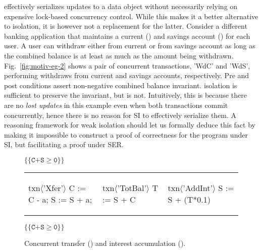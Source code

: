  effectively serializes updates to a data
object without necessarily relying on expensive lock-based concurrency
control. While this makes it a better alternative to
 isolation, it is however not a replacement for the
latter. Consider a different banking application that maintains a
current () and savings account () for each user. A user can
withdraw either from current or from savings account as long as the
combined balance is at least as much as the amount being withdrawn.
Fig.~\ref{fig:motiv-eg-2} shows a pair of concurrent transactions,
'WdC' and 'WdS', performing withdraws from current and savings
accounts, respectively. Pre and post conditions assert non-negative
combined balance invariant.  isolation is sufficient
to preserve the invariant, but  is not.
Intuitively, this is because there are no \emph{lost updates} in this
example even when both transactions commit concurrently, hence there
is no reason for SI to effectively serialize them. A reasoning
framework for weak isolation should let us formally deduce this fact
by making it impossible to construct a proof of correctness for the
program under SI, but facilitating a proof under SER.

\begin{figure}[t]
\centering
$\{\{\texttt{C+S}\ge\texttt{0}\}\}$
\begin{tabular}{l||l||l}
\begin{txnimpcode}
  txn$\langle$'Xfer'$\rangle${
    C := C - a;
    S := S + a;
  }
\end{txnimpcode}
&
\begin{txnimpcode}
  txn$\langle$'TotBal'$\rangle${
    T := S + C
  }
\end{txnimpcode}
&
\begin{txnimpcode}
  txn$\langle$'AddInt'$\rangle${
    S := S + (T*0.1)
  }
\end{txnimpcode}
\\
\end{tabular}
$\{\{\texttt{C+S}\ge\texttt{0}\}\}$

\caption{Concurrent transfer () and interest accumulation ().}
\label{fig:motiv-eg-3}
\end{figure}

